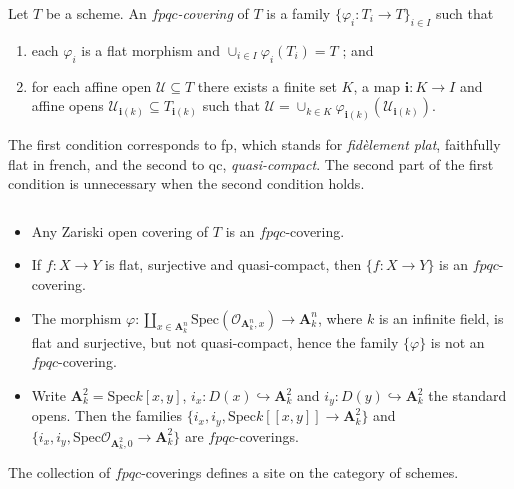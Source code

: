 \begin{definition}
Let $T$ be a scheme. An \emph{$fpqc$-covering} of $T$ is a family $\{ \varphi_i : T_i \to T\}_{i \in I}$ such that
\begin{enumerate}
\item 
each $\varphi_i$ is a flat morphism and $\cup_{i\in I} \varphi_i (T_i) = T$ ; and
\item
for each affine open $\mathcal{U} \subseteq T$  there exists a finite set $K$, a map $\mathbf{i} : K \to I$ and affine opens $\mathcal{U}_{\mathbf{i}(k)} \subseteq T_{\mathbf{i}(k)}$ such that $\mathcal{U} = \cup_{k \in K} \varphi_{\mathbf{i}(k)}(\mathcal{U}_{\mathbf{i}(k)})$.
\end{enumerate}
\end{definition}

\begin{remark}
The first condition corresponds to fp, which stands for \emph{fid\`element plat}, faithfully flat in french, and the second to qc, \emph{quasi-compact}. The second part of the first condition is unnecessary when the second condition holds.
\end{remark}

\begin{example}$ $
\begin{itemize}
\item Any Zariski open covering of $T$ is an $fpqc$-covering.
\item If $f: X \to Y$ is flat, surjective and quasi-compact, then $\{ f: X\to Y\}$ is an $fpqc$-covering.
\item The morphism $\varphi: \coprod_{x \in \mathbf{A}^n_k} \text{Spec} (\mathcal{O}_{\mathbf{A}^n_k,x}) \to \mathbf{A}^n_k $, where $k$ is an infinite field, is flat and surjective, but not quasi-compact, hence the family $\{ \varphi \}$ is not an $fpqc$-covering.
\item Write $\mathbf{A}^2_k = \text{Spec} k[x,y]$, $i_x : D(x) \hookrightarrow \mathbf{A}^2_k$ and $i_y : D(y) \hookrightarrow \mathbf{A}^2_k$ the standard opens. Then the families $\{i_x, i_y, \text{Spec} k[[ x,y ]] \to \mathbf{A}^2_k \}$ and $\{i_x, i_y, \text{Spec} \mathcal{O}_{\mathbf{A}^2_k,0} \to \mathbf{A}^2_k \}$ are $fpqc$-coverings.
\end{itemize}
\end{example}

\begin{lemma}
The collection of $fpqc$-coverings defines a site on the category of schemes.
\end{lemma}

